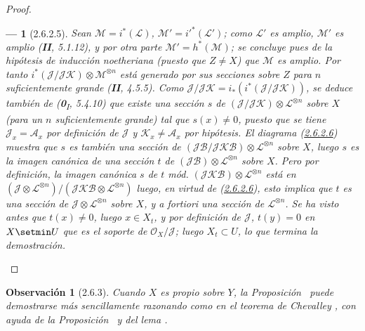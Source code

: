 \documentclass[10pt,oneside,openany]{book}
\theoremstyle{egaenv}\newtheorem*{env}{---}
\theoremstyle{egastatement}
\theoremstyle{egadescription}
\newtheorem*{remark}{Observación}
\newcommand{\oldpage}[2][]{\marginnote{\normalfont\scriptsize\textbf{#1}\,|\,#2}\ignorespaces}
\begin{document}
\begin{proof}
\begin{env}[2.6.2.5]
Sean $\mathcal M=i^*(\mathcal L)$, $\mathcal M'=i'^*(\mathcal L')$;
como $\mathcal L'$ es amplio, $\mathcal M'$ es amplio (\textbf{II}, 5.1.12), y
por otra parte $\mathcal M'=h^*(\mathcal M)$; se concluye pues de
la hipótesis de inducción noetheriana (puesto que $Z\neq X$) que
$\mathcal M$ es \emph{amplio}. Por tanto
$i^*(\mathcal J/\mathcal J\mathcal K)\otimes\mathcal M^{\otimes n}$ está
generado por sus secciones sobre $Z$ para $n$ suficientemente grande
(\textbf{II}, 4.5.5). Como
$\mathcal J/\mathcal J\mathcal K=i_*(i^*(\mathcal J/\mathcal J\mathcal K))$,
se deduce también de (\textbf{0}\textsubscript{I}, 5.4.10) que existe una sección
$s$ de $(\mathcal J/\mathcal J\mathcal K)\otimes
\mathcal L^{\otimes n}$ sobre $X$ (para un $n$ suficientemente grande) tal
que $s(x)\neq0$, puesto que se tiene $\mathcal J_x=\mathcal A_x$ por
definición de $\mathcal J$ y $\mathcal K_x\neq\mathcal A_x$ por
hipótesis. El diagrama (\hyperref[III.2.6.2.6-fr]{2.6.2.6}) muestra que
$s$ es también una sección de
$(\mathcal J\mathcal B/\mathcal J\mathcal K\mathcal B)
\otimes\mathcal L^{\otimes n}$ sobre $X$, luego $s$ es la \emph{imagen
canónica de una sección $t$ de}
$(\mathcal J\mathcal B)\otimes\mathcal L^{\otimes n}$ sobre $X$.
Pero por definición, la imagen canónica $s$ de $t$ mód.
$(\mathcal J\mathcal K\mathcal B)\otimes\mathcal L^{\otimes n}$ está
en
$(\mathcal J\otimes\mathcal L^{\otimes n})/
(\mathcal J\mathcal K\mathcal B\otimes\mathcal L^{\otimes n})$
luego, en virtud de (\hyperref[III.2.6.2.6-fr]{2.6.2.6}), esto implica que
$t$ es una \emph{sección de} $\mathcal J\otimes\mathcal L^{\otimes n}$
sobre $X$, y \emph{a fortiori} una sección de
$\mathcal L^{\otimes n}$. Se ha visto antes que $t(x)\neq0$, luego
$x\in X_t$, y por definición de $\mathcal J$, $t(y)=0$ en $X\setmin U$ que
es el soporte de $\mathcal O_X/\mathcal J$; luego $X_t\subset U$, lo que
termina la demostración.
\end{env}
\end{proof}

\oldpage[III]{115}

\begin{remark}[2.6.3]
\label{III.2.6.3}
\label{III.2.6.3-fr}
Cuando $X$ es \emph{propio} sobre $Y$, la Proposición~ puede demostrarse
más sencillamente razonando como en el teorema de Chevalley
, con ayuda de la Proposición~ y
del lema .
\end{remark}

\end{document}
